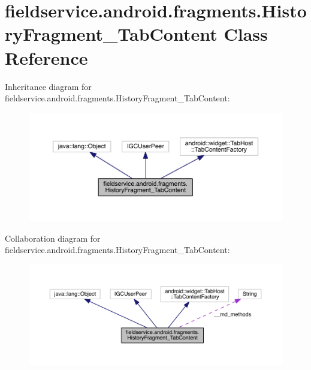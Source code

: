 \hypertarget{classfieldservice_1_1android_1_1fragments_1_1_history_fragment___tab_content}{\section{fieldservice.\+android.\+fragments.\+History\+Fragment\+\_\+\+Tab\+Content Class Reference}
\label{classfieldservice_1_1android_1_1fragments_1_1_history_fragment___tab_content}
}


Inheritance diagram for fieldservice.\+android.\+fragments.\+History\+Fragment\+\_\+\+Tab\+Content\+:
\nopagebreak
\begin{figure}[H]
\begin{center}
\leavevmode
\includegraphics[width=350pt]{classfieldservice_1_1android_1_1fragments_1_1_history_fragment___tab_content__inherit__graph}
\end{center}
\end{figure}


Collaboration diagram for fieldservice.\+android.\+fragments.\+History\+Fragment\+\_\+\+Tab\+Content\+:
\nopagebreak
\begin{figure}[H]
\begin{center}
\leavevmode
\includegraphics[width=350pt]{classfieldservice_1_1android_1_1fragments_1_1_history_fragment___tab_content__coll__graph}
\end{center}
\end{figure}
